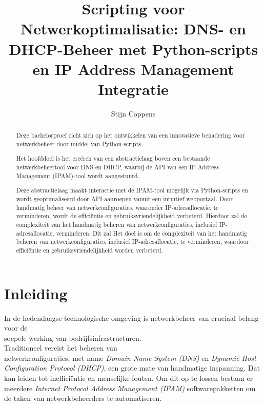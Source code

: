 \documentclass{hogent-article}
\title{Scripting voor Netwerkoptimalisatie: DNS- en DHCP-Beheer met Python-scripts en IP Address Management Integratie}
\author{Stijn Coppens}
\begin{document}
    
\begin{abstract}
Deze bachelorproef richt zich op het ontwikkelen van een innovatieve benadering voor netwerkbeheer door middel van Python-scripts.
 
Het hoofddoel is het creëren van een abstractielaag boven een bestaande netwerkbeheertool voor DNS en DHCP, waarbij de API van een IP Address Management (IPAM)-tool wordt aangestuurd. 

Deze abstractielaag maakt interactie met de IPAM-tool mogelijk via Python-scripts en wordt geoptimaliseerd door API-aanroepen vanuit een intuïtief webportaal. 
Door handmatig beheer van netwerkconfiguraties, waaronder IP-adresallocatie, te verminderen, wordt de efficiëntie en gebruiksvriendelijkheid verbeterd.
Hierdoor zal de complexiteit van het handmatig beheren van netwerkconfiguraties, inclusief IP-adresallocatie, verminderen.
Dit zal 
Het doel is om de complexiteit van het handmatig beheren van netwerkconfiguraties, inclusief IP-adresallocatie, te verminderen, waardoor efficiëntie en gebruiksvriendelijkheid worden verbeterd.    
\end{abstract}

\tableofcontents

\bigskip

\section{Inleiding}%
\label{sec:inleiding}
In de hedendaagse technologische omgeving is netwerkbeheer van cruciaal belang voor de \\soepele werking van bedrijfsinfrastructuren. 
\\ Traditioneel vereist het beheren van \\netwerkconfiguraties, met name \textit{Domain Name System (DNS)} en \textit{Dynamic Host Configuration Protocol (DHCP)}, een grote mate van handmatige inspanning. Dat kan leiden tot inefficiëntie en menselijke fouten. 
Om dit op te lossen bestaan er meerdere \textit{Internet Protocol Address Management (IPAM)} softwarepakketten om de taken van netwerkbeheerders te automatiseren. 

\end{document}
